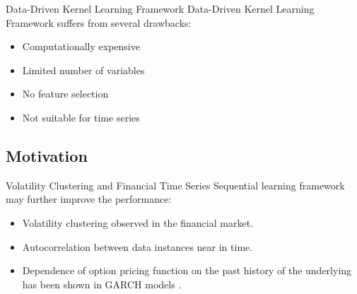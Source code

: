 \documentclass[10pt,table,mathserif]{beamer}
\begin{document}
\begin{frame}{Data-Driven Kernel Learning Framework}
Data-Driven Kernel Learning Framework \footnotemark suffers from several drawbacks:
\begin{itemize}
\item Computationally expensive
\item Limited number of variables
\item No feature selection
\item Not suitable for time series
\end{itemize}
\end{frame}

\subsection{Motivation}
\begin{frame}{Volatility Clustering and Financial Time Series}
Sequential learning framework may further improve the performance:
\begin{itemize}
  \item Volatility clustering observed in the financial market.
  \item Autocorrelation between data instances near in time.
  \item Dependence of option pricing function on the past history of the underlying has been shown in GARCH models \footnotemark.
\end{itemize}
\end{frame}
\end{document}
